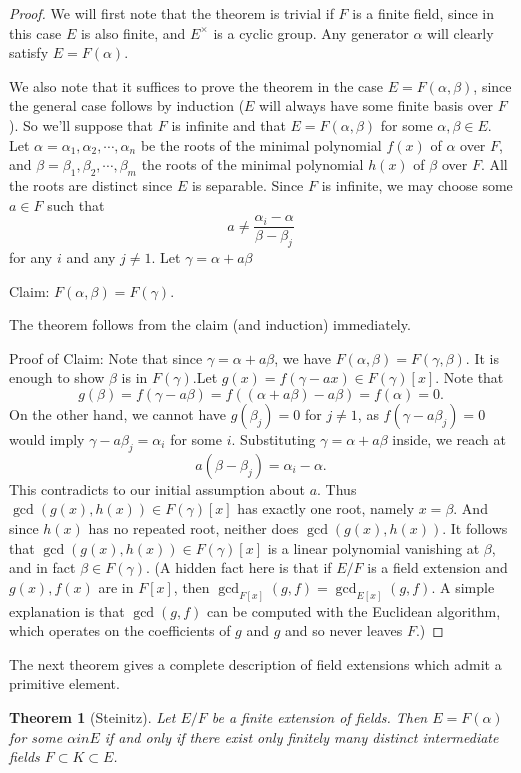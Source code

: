 \documentclass[12pt]{report}
\newtheorem{thm}{Theorem}[section]
\theoremstyle{definition}
\def\aa{\alpha}
\def\bb{\beta}
\begin{document}
\begin{proof}
    We will first note that the theorem is trivial if $F$ is a finite field, since in this case $E$ is also finite, and $E^\times$ is a cyclic group. Any generator $\aa$ will clearly satisfy $E = F(\aa)$.

    We also note that it suffices to prove the theorem in the case $E = F(\aa,\bb)$, since the general case follows by induction ($E$ will always have some finite basis over $F$). So we'll suppose that $F$ is infinite and that $E=F(\aa,\bb)$ for some $\aa,\bb\in E$.
    Let $\aa=\aa_1,\aa_2,\cdots,\aa_n$ be the roots of the minimal polynomial $f(x)$ of $\aa$ over $F$, and $\bb=\bb_1,\bb_2,\cdots,\bb_m$ the roots of the minimal polynomial $h(x)$ of $\bb$ over $F$. All the roots are distinct since $E$ is separable. Since $F$ is infinite, we may choose some $a \in F$ such that $$a\not= \frac{\aa_i-\aa}{\bb-\bb_j}$$ for any $i$ and any $j \not= 1$. Let $\gamma = \aa+a\bb$

    Claim: $F(\aa,\bb)=F(\gamma)$.

    The theorem follows from the claim (and induction) immediately.

    Proof of Claim: Note that since $\gamma = \aa+a\bb$, we have $F(\aa,\bb)=F(\gamma,\beta)$. It is enough to show $\beta$ is in $F(\gamma)$.Let $g(x) = f(\gamma - ax) \in F(\gamma)[x]$. Note that 
    $$g(\beta) =f(\gamma - a \beta) = f((\aa+a\bb)-a\bb) = f(\aa) = 0.$$
    On the other hand, we cannot have $g(\beta_j)=0$ for $j \not=1$, as $f(\gamma - a\beta_j)=0$ would imply $\gamma-a\beta_j=\aa_i$ for some $i$. Substituting $\gamma= \aa+a\bb$ inside, we reach at
     $$a(\bb-\bb_j)=\aa_i-\aa.$$
    This contradicts to our initial assumption about $a$. Thus $\gcd(g(x), h(x))\in F(\gamma)[x]$ has exactly one root, namely $x =\beta$. And since $h(x)$ has no repeated root, neither does $\gcd(g(x), h(x))$. It follows that $\gcd(g(x), h(x)) \in F(\gamma)[x]$ is a linear polynomial vanishing at $\beta$, and in fact $\beta \in F(\gamma)$. (A hidden fact here is that if $E/F$ is a field extension and $g(x),f(x)$ are in $F[x]$, then $\gcd_{F[x]}(g,f) = \gcd_{E[x]}(g,f)$. A simple explanation is that $\gcd(g,f)$ can be computed with the Euclidean algorithm, which operates on the coefficients of $g$ and $g$ and so never leaves $F$.)
\end{proof}

The next theorem gives a complete description of field extensions which admit a primitive
element.

\begin{thm}[Steinitz]\label{ste}
    Let $E/F$ be a finite extension of fields. Then $E = F(\aa)$ for some $\aa in E$ if and only if there exist only finitely many distinct intermediate fields $F \subset K \subset E$.
\end{thm}
\end{document}
